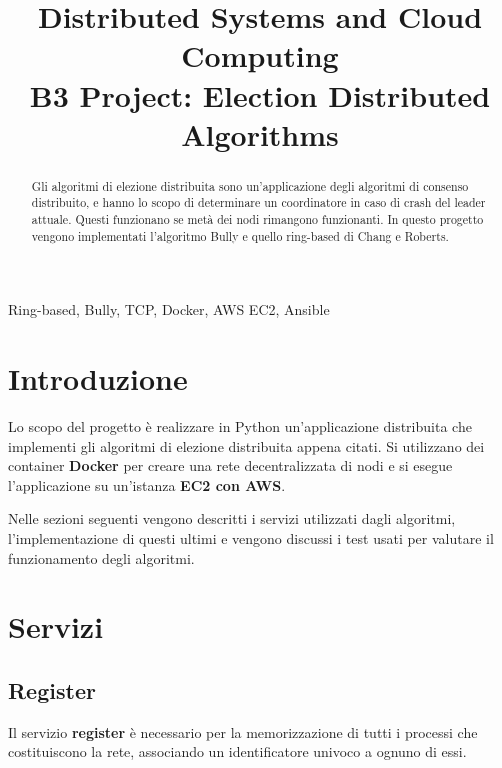 \documentclass[conference]{IEEEtran}
\begin{document}
\title{Distributed Systems and Cloud Computing \\ 
B3 Project: Election Distributed Algorithms}

\author{
}

\maketitle

\begin{abstract}
Gli algoritmi di elezione distribuita sono un'applicazione degli algoritmi di consenso distribuito, e hanno lo scopo di determinare un coordinatore in caso di crash del leader attuale.
Questi funzionano se metà dei nodi rimangono funzionanti.
In questo progetto vengono implementati l'algoritmo Bully e quello ring-based di Chang e Roberts.
\end{abstract}

\begin{IEEEkeywords}
Ring-based, Bully, TCP, Docker, AWS EC2, Ansible
\end{IEEEkeywords}


\section{Introduzione}
Lo scopo del progetto è realizzare in Python un'applicazione distribuita che implementi gli algoritmi di elezione distribuita appena citati.
Si utilizzano dei container \textbf{Docker} per creare una rete decentralizzata di nodi e si esegue l'applicazione su un'istanza \textbf{EC2 con AWS}.

Nelle sezioni seguenti vengono descritti i servizi utilizzati dagli algoritmi, l'implementazione di questi ultimi e vengono discussi i test usati per valutare il funzionamento degli algoritmi.


\section{Servizi}


\subsection{Register}\label{register}

Il servizio \textbf{register} è necessario per la memorizzazione di tutti i processi che costituiscono la rete, associando un identificatore univoco a ognuno di essi.
\end{document}
